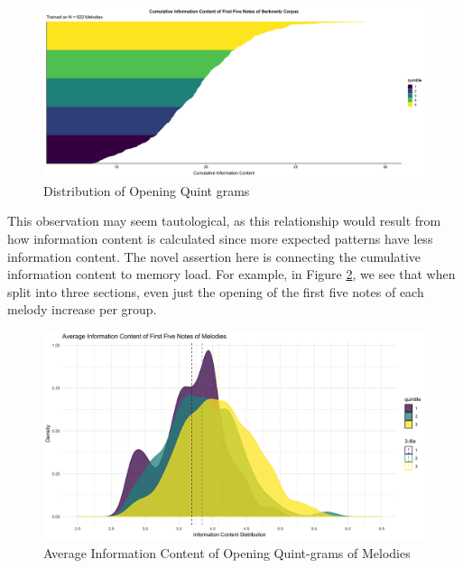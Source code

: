 \documentclass[12pt,]{book}
\begin{document}
\begin{figure}

{\centering \includegraphics[width=1\linewidth]{img/five_incipit_distiribution} 

}

\caption{Distribution of Opening Quint grams}\label{fig:quintdist}
\end{figure}

This observation may seem tautological, as this relationship would result from how information content is calculated since more expected patterns have less information content.
The novel assertion here is connecting the cumulative information content to memory load.
For example, in Figure \ref{fig:tridensity}, we see that when split into three sections, even just the opening of the first five notes of each melody increase per group.

\begin{figure}

{\centering \includegraphics[width=1\linewidth]{img/tri_distribution} 

}

\caption{Average Information Content of Opening Quint-grams of Melodies}\label{fig:tridensity}
\end{figure}
\end{document}
